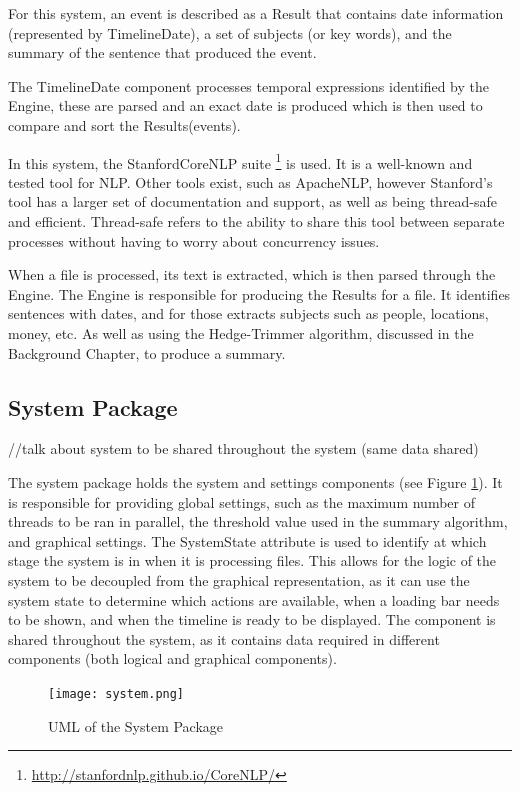 \par For this system, an event is described as a Result that contains date information (represented by TimelineDate), a set of subjects (or key words), and the summary of the sentence that produced the event.
\par The TimelineDate component processes temporal expressions identified by the Engine, these are parsed and an exact date is produced which is then used to compare and sort the Results(events).
\par In this system, the StanfordCoreNLP suite \footnote{\url{http://stanfordnlp.github.io/CoreNLP/}} is used. It is a well-known and tested tool for NLP. Other tools exist, such as ApacheNLP, however Stanford's tool has a larger set of documentation and support, as well as being thread-safe and efficient. Thread-safe refers to the ability to share this tool between separate processes without having to worry about concurrency issues. 
\par When a file is processed, its text is extracted, which is then parsed through the Engine. The Engine is responsible for producing the Results for a file. It identifies sentences with dates, and for those extracts subjects such as people, locations, money, etc. As well as using the Hedge-Trimmer algorithm, discussed in the Background Chapter, to produce a summary.

\subsection{System Package}
//talk about system to be shared throughout the system (same data shared)
\par The system package holds the system and settings components (see Figure \ref{fig:system}). It is responsible for providing global settings, such as the maximum number of threads to be ran in parallel, the threshold value used in the summary algorithm, and graphical settings. The SystemState attribute is used to identify at which stage the system is in when it is processing files. This allows for the logic of the system to be decoupled from the graphical representation, as it can use the system state to determine which actions are available, when a loading bar needs to be shown, and when the timeline is ready to be displayed. The component is shared throughout the system, as it contains data required in different components (both logical and graphical components).
\begin{figure}[H]
\caption{UML of the System Package}
\label{fig:system}
\texttt{[image: system.png]}
\centering
\end{figure}

